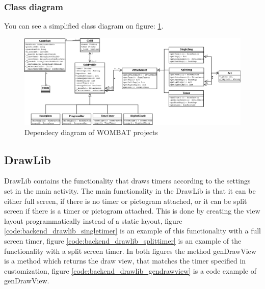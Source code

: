 \subsubsection{Class diagram}
You can see a simplified class diagram on figure: \ref{fig:classdiagram}.

\begin{figure}[H]
	\centering
		\includegraphics[scale=0.3]{Images/Implementation/classdiagram.png}
	\caption{Dependecy diagram of WOMBAT projects}
	\label{fig:classdiagram}
\end{figure}

\subsection{DrawLib}
DrawLib contains the functionality that draws timers according to the settings set in the main activity.
The main functionality in the DrawLib is that it can be either full screen, if there is no timer or pictogram attached, or it can be split screen if there is a timer or pictogram attached.
This is done by creating the view layout programmatically instead of a static layout, figure \ref{code:backend_drawlib_singletimer} is an example of this functionality with a full screen timer, figure \ref{code:backend_drawlib_splittimer} is an example of the functionality with a split screen timer.
In both figures the method genDrawView is a method which returns the draw view, that matches the timer specified in customization, figure \ref{code:backend_drawlib_gendrawview} is a code example of genDrawView.

